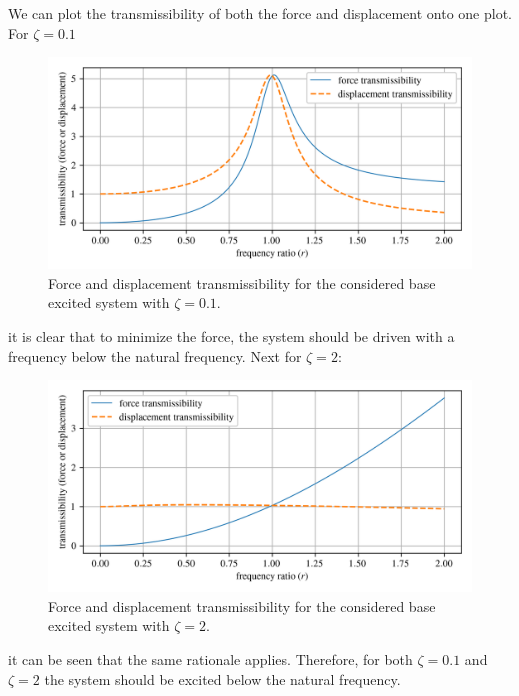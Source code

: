 \documentclass[12pt,letter]{article}
\begin{document}
\begin{example}
			 We can plot the transmissibility of both the force and displacement onto one plot. For $\zeta=0.1$
			\begin{figure}[H]
				\centering
				\includegraphics[]{../figures/base_excitation_force_and_displacement_transmissibility_1.png}
				\caption{Force and displacement transmissibility for the considered base excited system with $\zeta=0.1$.}
			\end{figure}
			\noindent it is clear that to minimize the force, the system should be driven with a frequency below the natural frequency. Next for  $\zeta=2$:
			\begin{figure}[H]
				\centering
				\includegraphics[]{../figures/base_excitation_force_and_displacement_transmissibility_2.png}
				\caption{Force and displacement transmissibility for the considered base excited system with $\zeta=2$.}
			\end{figure}
			\noindent it can be seen that the same rationale applies. Therefore, for both $\zeta=0.1$ and $\zeta=2$ the system should be excited below the natural frequency.
		
		\end{example}

		
					
\end{document}
